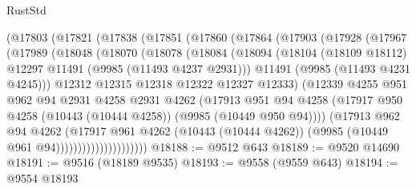 \begin{lexlean}{RustStd}
\begin{coremodule}
          (@17803
            (@17821
              (@17838
                (@17851
                  (@17860
                    (@17864
                      (@17903
                        (@17928
                          (@17967
                            (@17989
                              (@18048
                                (@18070
                                  (@18078
                                    (@18084
                                      (@18094
                                        (@18104
                                          (@18109 @18112)
                                          @12297
                                          @11491
                                          (@9985 (@11493 @4237 @2931)))
                                        @11491
                                        (@9985 (@11493 @4231 @4245)))
                                      @12312
                                      @12315
                                      @12318
                                      @12322
                                      @12327
                                      @12333)
                                    (@12339
                                      @4255
                                      @951
                                      @962
                                      @94
                                      @2931
                                      @4258
                                      @2931
                                      @4262
                                      (@17913
                                        @951
                                        @94
                                        @4258
                                        (@17917
                                          @950
                                          @4258
                                          (@10443 (@10444 @4258))
                                          (@9985 (@10449 @950 @94))))
                                      (@17913
                                        @962
                                        @94
                                        @4262
                                        (@17917
                                          @961
                                          @4262
                                          (@10443 (@10444 @4262))
                                          (@9985 (@10449 @961 @94)))))))))))))))))))))
@18188 := @9512 @643
@18189 := @9520 @14690
@18191 := @9516 (@18189 @9535)
@18193 := @9558 (@9559 @643)
@18194 := @9554 @18193

\end{coremodule}
\end{lexlean}
